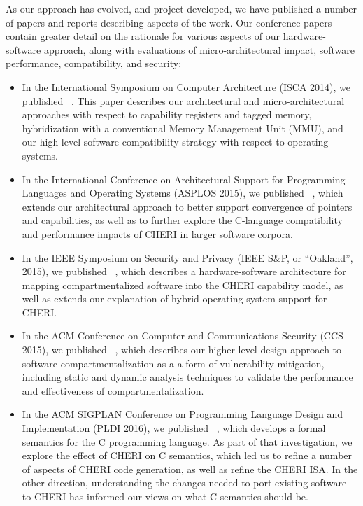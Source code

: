 As our approach has evolved, and project developed, we have published a number
of papers and reports describing aspects of the work.
Our conference papers contain greater detail on the rationale for various
aspects of our hardware-software approach, along with evaluations of
micro-architectural impact, software performance, compatibility, and security:

\begin{itemize}
\item In the International Symposium on Computer Architecture (ISCA 2014), we
  published ~\cite{woodruff:cheriisca2014}.
  This paper describes our architectural and micro-architectural approaches
  with respect to capability registers and tagged memory, hybridization with a
  conventional Memory Management Unit (MMU), and our high-level software
  compatibility strategy with respect to operating systems.

\item In the International Conference on Architectural Support for Programming
  Languages and Operating Systems (ASPLOS 2015), we published
  ~\cite{ChisnallCPDP11}, which extends our architectural approach to
  better support convergence of pointers and capabilities, as well as to
  further explore the C-language compatibility and performance impacts of
  CHERI in larger software corpora.

\item In the IEEE Symposium on Security and Privacy (IEEE S\&P, or
  ``Oakland'', 2015), we
  published ~\cite{watson15:cheri}, which
  describes a hardware-software architecture for mapping compartmentalized
  software into the CHERI capability model, as well as extends our explanation
  of hybrid operating-system support for CHERI.

\item In the ACM Conference on Computer and Communications Security (CCS
  2015), we published ~\cite{gudka15:soaap},
  which describes our higher-level design
  approach to software compartmentalization as a a form of vulnerability
  mitigation, including static and dynamic analysis techniques to validate the
  performance and effectiveness of compartmentalization.

\item In the ACM SIGPLAN Conference on Programming Language Design and
  Implementation (PLDI 2016), we published
  ~\cite{Cerberus-PLDI16}, which develops a
  formal semantics for the C programming language.
  As part of that investigation, we explore the effect of CHERI on C
  semantics, which led us to refine a number of aspects of CHERI code
  generation, as well as refine the CHERI ISA.  In the other
  direction, understanding the changes needed to port existing
  software to CHERI has informed our views on what C semantics should be.


\end{itemize}
